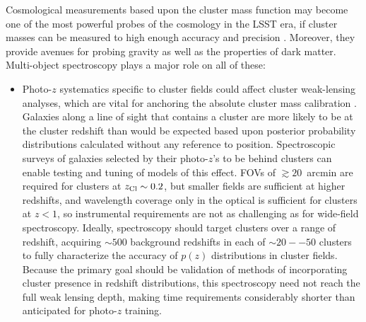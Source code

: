 Cosmological measurements based upon the cluster mass function may become one of the most powerful probes of the cosmology in the LSST era, if cluster masses can be measured to high enough accuracy and precision \citep{visions,Krause}.  Moreover, they provide avenues for probing gravity as well as the properties of dark matter.  Multi-object spectroscopy plays a major role on all of these:

\begin{itemize}
\item Photo-$z$ systematics specific to cluster fields could affect cluster weak-lensing analyses, which are vital for anchoring the absolute cluster mass calibration \citep{Applegate}.  Galaxies along a line of sight that contains a cluster are more likely to be at the cluster redshift than would be expected based upon posterior probability distributions calculated without any reference to position.  %
Spectroscopic surveys of galaxies selected by their photo-$z$'s to be behind clusters can enable testing and tuning of models of this effect.  FOVs of $\gtrsim 20$~arcmin are required for clusters at $z_{\rm Cl}\sim 0.2$, but smaller fields are sufficient at higher redshifts, and wavelength coverage only in the optical is sufficient for clusters at $z<1$, so instrumental requirements are not as challenging as for wide-field spectroscopy.  
Ideally, spectroscopy should target clusters over a range of redshift, acquiring $\sim 500$ background redshifts in each of  $\sim 20--50$ clusters to fully characterize the accuracy of $p(z)$ distributions in cluster fields.  Because the primary goal should be validation of methods of incorporating cluster presence in redshift distributions, this spectroscopy need not reach the full weak lensing depth, making time requirements considerably shorter than anticipated for photo-$z$ training.


\end{itemize}
